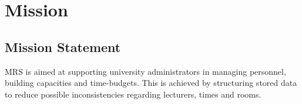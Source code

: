 \chapter{Mission}
\section{Mission Statement}
MRS is aimed at supporting university administrators in managing personnel, building capacities and time-budgets.
This is achieved by structuring stored data to reduce possible inconsistencies regarding lecturers, times and rooms.
